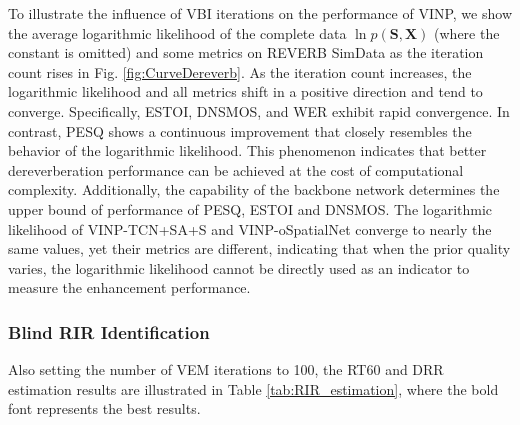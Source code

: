 To illustrate the influence of VBI iterations on the performance of VINP, we show the average logarithmic likelihood of the complete data $\ln p(\mathbf{S},\mathbf{X})$ (where the constant is omitted) and some metrics on REVERB SimData as the iteration count rises in Fig. \ref{fig:CurveDereverb}.
As the iteration count increases, the logarithmic likelihood and all metrics shift in a positive direction and tend to converge.
Specifically, ESTOI, DNSMOS, and WER exhibit rapid convergence. 
In contrast, PESQ shows a continuous improvement that closely resembles the behavior of the logarithmic likelihood.
This phenomenon indicates that better dereverberation performance can be achieved at the cost of computational complexity.
Additionally, the capability of the backbone network determines the upper bound of performance of PESQ, ESTOI and DNSMOS.
The logarithmic likelihood of VINP-TCN+SA+S and VINP-oSpatialNet converge to nearly the same values, yet their metrics are different, indicating that when the prior quality varies, the logarithmic likelihood cannot be directly used as an indicator to measure the enhancement performance.




\subsubsection{Blind RIR Identification}

Also setting the number of VEM iterations to 100, the RT60 and DRR estimation results are illustrated in Table \ref{tab:RIR_estimation}, where the bold font represents the best results.

